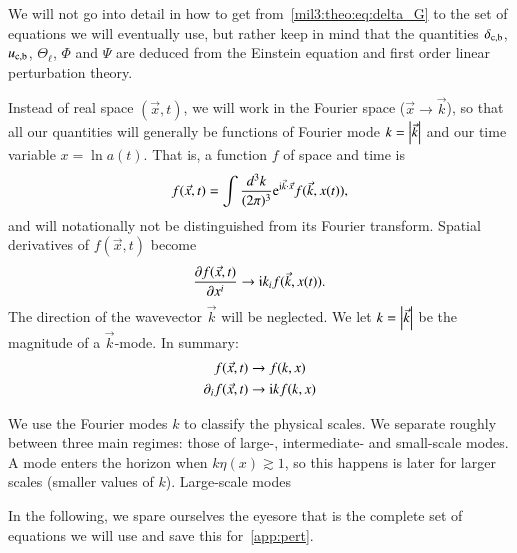 We will not go into detail in how to get from~\cref{mil3:theo:eq:delta_G} to the set of equations we will eventually use, but rather keep in mind that the quantities $\delta_\mathrm{c,b}$, $u_\mathrm{c,b}$, $\Theta_\ell$, $\Phi$ and $\Psi$ are deduced from the Einstein equation and first order linear perturbation theory. 


Instead of real space $(\vec{x}, t)$, we will work in the Fourier space ($\vec{x}\to\vec{k}$), so that all our quantities will generally be functions of Fourier mode $k=\abs{\vec{k}}$ and our time variable $x = \ln{a(t)}$. That is, a function $f$ of space and time is
\begin{equation}
    f(\vec{x}, t) = \int \frac{d^3 k}{(2\pi)^3} \eu^{\im \vec{k}\cdot \vec{x}}f(\vec{k}, x(t)),
\end{equation}
and will notationally not be distinguished from its Fourier transform. Spatial derivatives of $f(\vec{x}, t)$ become
\begin{equation}
    \pdv{f(\vec{x}, t)}{x^i} \to \mathrm{i} k_i f(\vec{k}, x(t)).
\end{equation}
The direction of the wavevector $\vec{k}$ will be neglected. We let $k=\abs{\vec{k}}$ be the magnitude of a $\vec{k}$-mode. In summary:
\begin{equation}
\begin{split}
    f(\vec{x}, t) &\to f(k, x) \\
    \partial_i f(\vec{x}, t) &\to \mathrm{i} k f(k, x)
\end{split}
\end{equation}

We use the Fourier modes $k$ to classify the physical scales. We separate roughly between three main regimes: those of large-, intermediate- and small-scale modes. A mode enters the horizon when $k\eta(x) \gtrsim 1$, so this happens is later for larger scales (smaller values of $k$). Large-scale modes 

In the following, we spare ourselves the eyesore that is the complete set of equations we will use and save this for~\cref{app:pert}.


